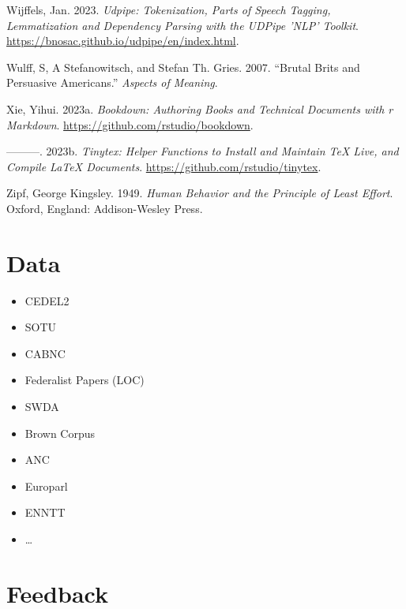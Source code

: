 \documentclass[
  letterpaper,
  DIV=11,
  numbers=noendperiod]{scrreport}
\providecommand{\tightlist}{%
  \setlength{\itemsep}{0pt}\setlength{\parskip}{0pt}}\usepackage{longtable,booktabs,array}
\newlength{\cslhangindent}
\newlength{\cslentryspacingunit} %
\newenvironment{CSLReferences}[2] %
 {%
  \setlength{\parindent}{0pt}
  \ifodd #1
  \let\oldpar\par
  \def\par{\hangindent=\cslhangindent\oldpar}
  \fi
  \setlength{\parskip}{#2\cslentryspacingunit}
 }%
 {}
\theoremstyle{definition}
\theoremstyle{remark}
\begin{document}
\begin{CSLReferences}{1}{0}
\leavevmode{}%
Wijffels, Jan. 2023. \emph{Udpipe: Tokenization, Parts of Speech
Tagging, Lemmatization and Dependency Parsing with the UDPipe 'NLP'
Toolkit}. \url{https://bnosac.github.io/udpipe/en/index.html}.

\leavevmode{}%
Wulff, S, A Stefanowitsch, and Stefan Th. Gries. 2007. {``Brutal Brits
and Persuasive Americans.''} \emph{Aspects of Meaning}.

\leavevmode{}%
Xie, Yihui. 2023a. \emph{Bookdown: Authoring Books and Technical
Documents with r Markdown}. \url{https://github.com/rstudio/bookdown}.

\leavevmode{}%
---------. 2023b. \emph{Tinytex: Helper Functions to Install and
Maintain TeX Live, and Compile LaTeX Documents}.
\url{https://github.com/rstudio/tinytex}.

\leavevmode{}%
Zipf, George Kingsley. 1949. \emph{Human Behavior and the Principle of
Least Effort}. Oxford, England: Addison-Wesley Press.

\end{CSLReferences}

\cleardoublepage
{}
{}
\appendix

\hypertarget{data-appendix}{%
\chapter{Data}\label{data-appendix}}

\begin{itemize}
\tightlist
\item
  CEDEL2
\item
  SOTU
\item
  CABNC
\item
  Federalist Papers (LOC)
\item
  SWDA
\item
  Brown Corpus
\item
  ANC
\item
  Europarl
\item
  ENNTT
\item
  \ldots{}
\end{itemize}

\hypertarget{feedback-appendix}{%
\chapter{\texorpdfstring{Feedback
}{Feedback }}\label{feedback-appendix}}
\end{document}
